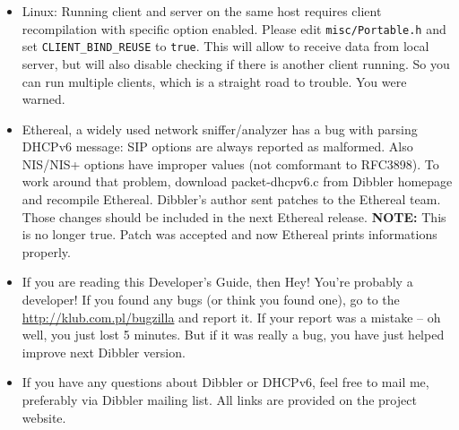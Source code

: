 \begin{itemize}
\item Linux: Running client and server on the same host requires
  client recompilation with specific option enabled. Please edit
  \verb+misc/Portable.h+ and set \verb+CLIENT_BIND_REUSE+ to
  \verb+true+. This will allow to receive data from local server, but
  will also disable checking if there is another client running. So
  you can run multiple clients, which is a straight road to
  trouble. You were warned.
\item Ethereal, a widely used network sniffer/analyzer has a bug with
  parsing DHCPv6 message: SIP options are always reported as
  malformed. Also NIS/NIS+ options have improper values (not
  comformant to RFC3898). To work around that problem, download
  packet-dhcpv6.c from Dibbler homepage and recompile
  Ethereal. Dibbler's author sent patches to the Ethereal team. Those
  changes should be included in the next Ethereal
  release. \textbf{NOTE:} This is no longer true. Patch was accepted
  and now Ethereal prints informations properly.
\item If you are reading this Developer's Guide, then Hey! You're
  probably a developer! If you found any bugs (or think you found
  one), go to the
  \href{http://klub.com.pl/bugzilla}{http://klub.com.pl/bugzilla}
   and report it. If your report was a mistake -- oh well, you just
  lost 5 minutes. But if it was really a bug, you have just helped improve
  next Dibbler version.
\item If you have any questions about Dibbler or DHCPv6, feel free to
  mail me, preferably via Dibbler mailing list. All links are provided
  on the project website.
\end{itemize}
